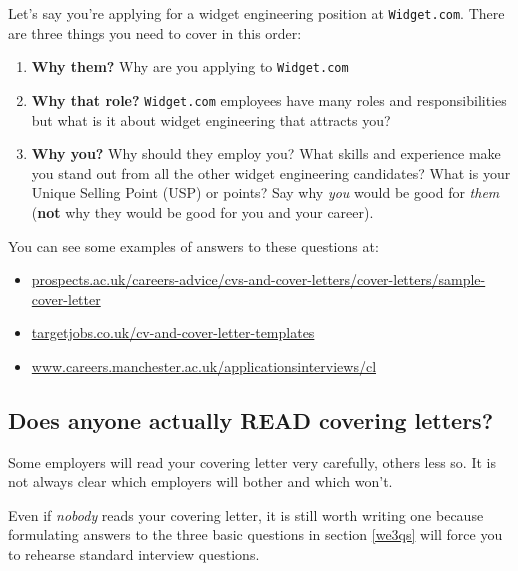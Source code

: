 \documentclass[
]{book}
\providecommand{\tightlist}{%
  \setlength{\itemsep}{0pt}\setlength{\parskip}{0pt}}
\begin{document}
Let's say you're applying for a widget engineering position at \texttt{Widget.com}. There are three things you need to cover in this order:

\begin{enumerate}
\def\labelenumi{\arabic{enumi}.}
\tightlist
\item
  \textbf{Why them?} Why are you applying to \texttt{Widget.com}
\item
  \textbf{Why that role?} \texttt{Widget.com} employees have many roles and responsibilities but what is it about widget engineering that attracts you?
\item
  \textbf{Why you?} Why should they employ you? What skills and experience make you stand out from all the other widget engineering candidates? What is your Unique Selling Point (USP) or points? Say why \emph{you} would be good for \emph{them} (\textbf{not} why they would be good for you and your career).
\end{enumerate}

You can see some examples of answers to these questions at:

\begin{itemize}
\tightlist
\item
  \href{https://www.prospects.ac.uk/careers-advice/cvs-and-cover-letters/cover-letters/sample-cover-letter}{prospects.ac.uk/careers-advice/cvs-and-cover-letters/cover-letters/sample-cover-letter}
\item
  \href{https://targetjobs.co.uk/cv-and-cover-letter-templates}{targetjobs.co.uk/cv-and-cover-letter-templates}
\item
  \href{https://www.careers.manchester.ac.uk/applicationsinterviews/cl/}{www.careers.manchester.ac.uk/applicationsinterviews/cl}
\end{itemize}

\hypertarget{elevatorpitch}{%
\subsection{Does anyone actually READ covering letters?}\label{elevatorpitch}}

Some employers will read your covering letter very carefully, others less so. It is not always clear which employers will bother and which won't.

Even if \emph{nobody} reads your covering letter, it is still worth writing one because formulating answers to the three basic questions in section \ref{we3qs} will force you to rehearse standard interview questions.
\end{document}
